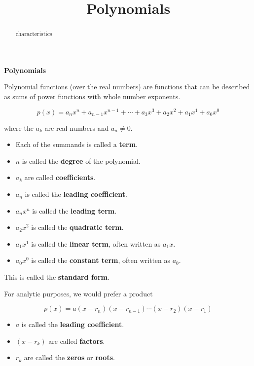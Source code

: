 \documentclass{ximera}
\title{Polynomials}
\begin{document}
\begin{abstract}
characteristics
\end{abstract}
\maketitle




\begin{definition} \textbf{\textcolor{green!50!black}{Polynomials}} 


Polynomial functions (over the real numbers) are functions that can be described as sums of power functions with whole number exponents.


\[    p(x) = a_n x^n + a_{n-1} x^{n-1} + \cdots + a_3 x^3 + a_2 x^2 + a_1 x^1 + a_0 x^0      \]

where the $a_k$ are real numbers and $a_n \ne 0$.


\begin{itemize}
\item Each of the summands is called a \textbf{term}.  
\item $n$ is called the \textbf{degree} of the polynomial.
\item $a_k$ are called \textbf{coefficients}.
\item $a_n$ is called the \textbf{leading coefficient}.
\item $a_n x^n$ is called the \textbf{leading term}.
\item $a_2 x^2$ is called the \textbf{quadratic term}.
\item $a_1 x^1$ is called the \textbf{linear term}, often written as $a_1 x$.
\item $a_0 x^0$ is called the \textbf{constant term}, often written as $a_0$.

\end{itemize}



This is called the \textbf{standard form}.
\end{definition}





For analytic purposes, we would prefer a product

\[   p(x) = a (x-r_n)(x-r_{n-1})  \cdots (x-r_2)(x-r_1)  \]


\begin{itemize}

\item $a$ is called the \textbf{leading coefficient}.
\item $(x-r_k)$ are called \textbf{factors}.
\item $r_k$ are called the \textbf{zeros} or \textbf{roots}.

\end{itemize}
\end{document}
